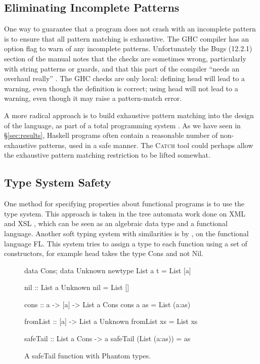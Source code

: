\documentclass[preprint]{sigplanconf}
\newcommand{\C}[1]{\textsf{#1}}
\newcommand{\catch}{\textsc{Catch}}
\begin{document}
\subsection{Eliminating Incomplete Patterns}

One way to guarantee that a program does not crash with an incomplete pattern is to ensure that all pattern matching is exhaustive. The GHC compiler \citep{ghc} has an option flag to warn of any incomplete patterns. Unfortunately the Bugs (12.2.1) section of the manual notes that the checks are sometimes wrong, particularly with string patterns or guards, and that this part of the compiler ``needs an overhaul really'' \citep{ghc}. The GHC checks are only local: defining \C{head} will lead to a warning, even though the definition is correct; using \C{head} will not lead to a warning, even though it may raise a pattern-match error.

A more radical approach is to build exhaustive pattern matching into the design of the language, as part of a total programming system \citep{turner:total}. As we have seen in \S\ref{sec:results}, Haskell programs often contain a reasonable number of non-exhaustive patterns, used in a safe manner. The \catch{} tool could perhaps allow the exhaustive pattern matching restriction to be lifted somewhat.


\subsection{Type System Safety}

One method for specifying properties about functional programs is to use the type system. This approach is taken in the tree automata work done on XML and XSL \citep{static_xslt}, which can be seen as an algebraic data type and a functional language. Another soft typing system with similarities is by \citet{aiken:type_infer}, on the functional language FL. This system tries to assign a type to each function using a set of constructors, for example \C{head} takes the type \C{Cons} and not \C{Nil}.

\begin{figure}
\begin{code}
data Cons; data Unknown
newtype List a t = List [a]

nil :: List a Unknown
nil = List []

cons :: a -> [a] -> List a Cons
cons a as = List (a:as)

fromList :: [a] -> List a Unknown
fromList xs = List xs

safeTail :: List a Cons -> a
safeTail (List (a:as)) = as
\end{code}
\caption{A \C{safeTail} function with Phantom types.}
\label{fig:phantom}
\end{figure}
\end{document}
